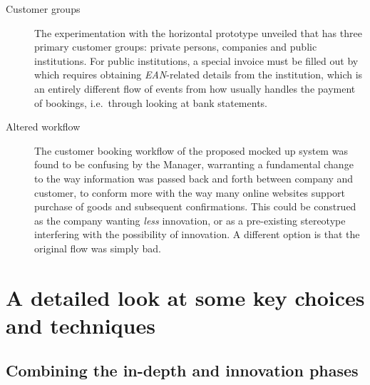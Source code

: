 \begin{description}
    \item [Customer groups] The experimentation with the horizontal prototype unveiled that 
        \gomonkey{} has three primary customer groups: private persons, companies and public
        institutions. For public institutions, a special invoice must be filled
        out by \gomonkey{} which requires obtaining \textit{EAN}-related details
        from the institution, which is an entirely different flow of events from
        how \gomonkey{} usually handles the payment of bookings, i.e.\ through
        looking at bank statements. 
    \item [Altered workflow] The customer booking workflow of the proposed mocked up 
        system was found to be confusing by the Manager, warranting a fundamental change 
        to the way information was passed back and forth between company and customer, 
        to conform more with the way many online websites support purchase of goods and 
        subsequent confirmations. This could be construed as the company wanting
        \textit{less} innovation, or as a pre-existing stereotype interfering
        with the possibility of innovation. A different option is that the
        original flow was simply bad.
\end{description}

\section{A detailed look at some key choices and techniques} \label{sec:detailed}
\subsection{Combining the in-depth and innovation phases}

% 

